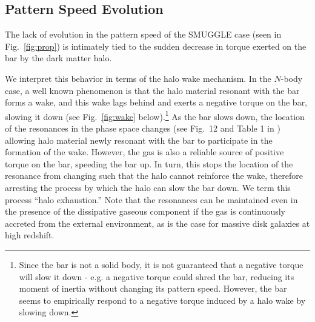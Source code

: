 \documentclass[twocolumn,linenumbers]{aastex631}
\newcommand{\Nbody}{$N$-body}
\newcommand{\SMUGGLE}{SMUGGLE}
\begin{document}
\subsection{Pattern Speed Evolution}
The lack of evolution in the pattern speed of the \SMUGGLE{} case (seen in
Fig.~\ref{fig:prop}) is intimately tied to the sudden decrease in torque exerted
on the bar by the dark matter halo. 

We interpret this behavior in terms of the halo wake mechanism. In the
\Nbody{} case, a well known phenomenon is that the halo material resonant with
the bar forms a wake, and this wake lags behind \citep{1984MNRAS.209..729T,
1985MNRAS.213..451W, 1992ApJ...400...80H} and exerts a negative torque on the
bar, slowing it down (see Fig.~\ref{fig:wake} below).\footnote{Since the bar is not a solid
body, it is not guaranteed that a negative torque will slow it down - e.g. a
negative torque could shred the bar, reducing its moment of inertia without
changing its pattern speed. However, the bar seems to empirically respond to a
negative torque induced by a halo wake by slowing down.} As the bar slows down,
the location of the resonances in the phase space changes (see Fig.~12 and Table
1 in \citet{2020ApJ...890..117D}) allowing halo material newly resonant with the
bar to participate in the formation of the wake. However, the gas is also a
reliable source of positive torque on the bar, speeding the bar up. In turn,
this stops the location of the resonance from changing such that the halo cannot
reinforce the wake, therefore arresting the process by which the halo can slow
the bar down. We term this process ``halo exhaustion.'' Note that the resonances
can be maintained even in the presence of the dissipative gaseous component if
the gas is continuously accreted from the external environment, as is the case
for massive disk galaxies at high redshift.

\end{document}

